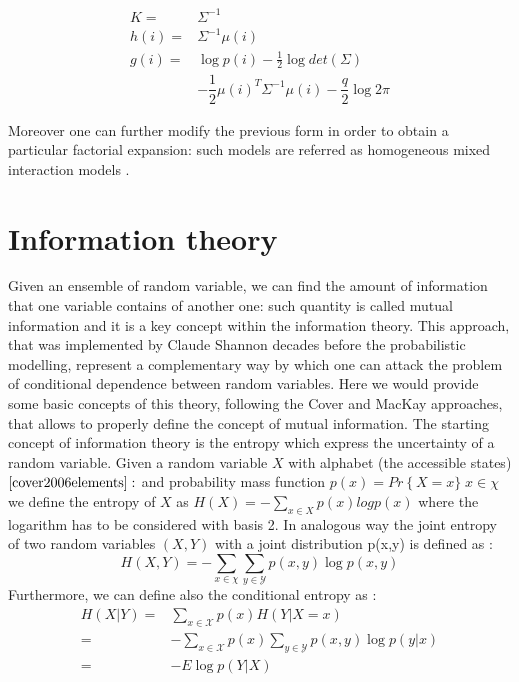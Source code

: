 \documentclass[12pt,%
               a4paper,%
               oneside,openany,%
               titlepage,%
               headinclude,footinclude,%
               BCOR5mm,%
               cleardoublepage=empty,%
               tablecaptionabove,%
               floatperchapter,
               ]{scrreprt}                 %
\begin{document}
\begin{equation}
\begin{split}
K=&\Sigma^{-1} \\
h(i)=&\Sigma^{-1}\mu(i) \\
g(i)=&\log p(i) -\frac{1}{2}\log det (\Sigma) \\
&-\dfrac{1}{2}\mu(i)^{T}\Sigma^{-1}\mu(i)-\dfrac{q}{2}\log 2\pi
\end{split}
\end{equation}

Moreover one can further modify the previous form in order to obtain a particular factorial expansion: such models are referred as homogeneous mixed interaction models \cite{hojsgaard2012graphical}.

\section{Information theory}
Given an ensemble of random variable, we can find the amount of information that one variable contains of another one: such quantity is called mutual information and it is a key concept within the information theory. This approach, that was implemented by Claude Shannon decades before the probabilistic modelling, represent a complementary way by which one can attack the problem of conditional dependence between random variables. Here we would provide some basic concepts of this theory, following the Cover \cite{cover2006elements} and MacKay \cite{mackay2003information} approaches, that allows to properly define the concept of mutual information. The starting concept of information theory is the entropy which express the uncertainty of a random variable. Given a random variable $X$ with alphabet (the accessible states) $\cite{cover2006elements}:$ and probability mass function $p(x)=Pr\left\lbrace X=x \rbrace\; x \in \chi$ we define the entropy of $X$ as $H(X)=-\sum_{x \in X} p(x)log p(x)$ where the logarithm has to be considered with basis 2. In analogous way the joint entropy of two random variables $(X,Y)$ with a joint distribution p(x,y) is defined as \cite{cover2006elements}:
\begin{equation}
H(X,Y)=-\sum_{x\in \chi}\sum_{y\in \mathcal{Y}}p(x,y)\log p(x,y)
\end{equation}
Furthermore, we can define also the conditional entropy as \cite{cover2006elements}:
\begin{equation}
\begin{split}
H(X|Y)=& \sum_{x\in \mathcal{X} }p(x)H(Y|X=x)\\
=& -\sum_{x\in \mathcal{X}}p(x)\sum_{y\in \mathcal{Y}}p(x,y)\log p(y|x) \\
=& -E\log p(Y|X)
\end{split}
\end{equation}
\end{document}
